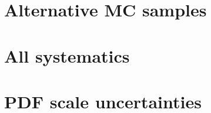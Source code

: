 
\clearpage
\section{Alternative MC samples}
\label{app:altsample}


\clearpage
\section{All systematics}
\label{app:allsyst}


\clearpage
\section{PDF scale uncertainties}
\label{app:pdfscale}


